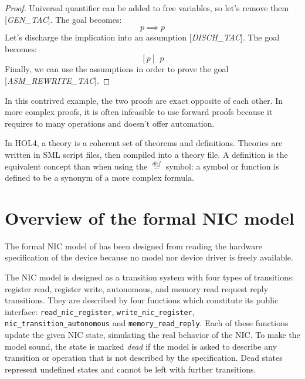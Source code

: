 \documentclass{kththesis}
\newcommand{\eqdef}{\stackrel{def}{=}}
\begin{document}
{{
\renewcommand*{\proofname}{Backward proof}
\begin{proof}
Universal quantifier can be added to free variables, so let's remove them [\textit{GEN\_TAC}]. The goal becomes:
$$p \implies p$$
Let's discharge the implication into an assumption [\textit{DISCH\_TAC}]. The goal becomes:
$$[p]~~p$$
Finally, we can use the assumptions in order to prove the goal [\textit{ASM\_REWRITE\_TAC}].
\end{proof}
}

In this contrived example, the two proofs are exact opposite of each other. In more complex proofs, it is often infeasible to use forward proofs because it requires to many operations and doesn't offer automation.

In HOL4, a theory is a coherent set of theorems and definitions. Theories are written in \gls{SML} script files, then compiled into a theory file. A definition is the equivalent concept than when using the $\eqdef$ symbol: a symbol or function is defined to be a synonym of a more complex formula.

\section{Overview of the formal NIC model} \label{overview-nic-model}
The formal NIC model of \cite{haglund_formal_2016} has been designed from reading the hardware specification of the device because no model nor device driver is freely available.

The NIC model is designed as a transition system with four types of transitions: register read, register write, autonomous, and memory read request reply transitions. They are described by four functions which constitute its public interface: \texttt{read\_nic\_register}, \texttt{write\_nic\_register}, \texttt{nic\_transition\_autonomous} and \texttt{memory\_read\_reply}. Each of these functions update the given NIC state, simulating the real behavior of the NIC. To make the model sound, the state is marked \textit{dead} if the model is asked to describe any transition or operation that is not described by the specification. Dead states represent undefined states and cannot be left with further transitions.

}
\end{document}
